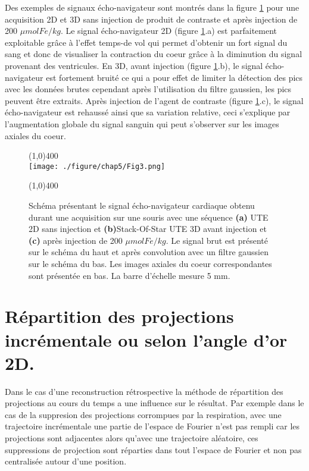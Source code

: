 Des exemples de signaux écho-navigateur sont montrés dans la figure \ref{fig:Signal} pour une acquisition 2D et 3D sans injection de produit de contraste et après injection de 200 $\mu mol Fe/kg$. Le signal écho-navigateur 2D (figure \ref{fig:Signal}.a) est parfaitement exploitable grâce à l'effet temps-de vol qui permet d'obtenir un fort signal du sang et donc de visualiser la contraction du coeur grâce à la diminution du signal provenant des ventricules. En 3D, avant injection (figure \ref{fig:Signal}.b), le signal écho-navigateur est fortement bruité ce qui a pour effet de limiter la détection des pics avec les données brutes cependant après l'utilisation du filtre gaussien, les pics peuvent être extraits. Après injection  de l'agent de contraste (figure \ref{fig:Signal}.c), le signal écho-navigateur est rehaussé ainsi que sa variation relative, ceci s'explique par l'augmentation globale du signal sanguin qui peut s'observer sur les images axiales du coeur.

\begin{figure}[H]
\centering
\line(1,0){400} \\
\texttt{[image: ./figure/chap5/Fig3.png]}
\caption[Signal d'écho-navigateur]{\label{fig:Signal} Schéma présentant le signal écho-navigateur cardiaque obtenu durant une acquisition sur une souris avec une séquence \textbf{(a)} UTE 2D sans injection et \textbf{(b)}Stack-Of-Star UTE 3D avant injection et \textbf{(c)} après injection de 200 $\mu mol Fe/kg$. Le signal brut est présenté sur le schéma du haut et après convolution avec un filtre gaussien sur le schéma du bas. Les images axiales du coeur correspondantes sont présentée en bas. La barre d'échelle mesure 5 mm.}
\line(1,0){400} \\ 
\end{figure}

\section{Répartition des projections incrémentale ou selon l'angle d'or 2D.}

Dans le cas d'une reconstruction rétrospective la méthode de répartition des projections au cours du temps a une influence sur le résultat. Par exemple dans le cas de la suppresion des projections corrompues par la respiration, avec une trajectoire incrémentale une partie de l'espace de Fourier n'est pas rempli car les projections sont adjacentes alors qu'avec une trajectoire aléatoire, ces suppressions de projection sont réparties dans tout l'espace de Fourier et non pas centralisée autour d'une position.

